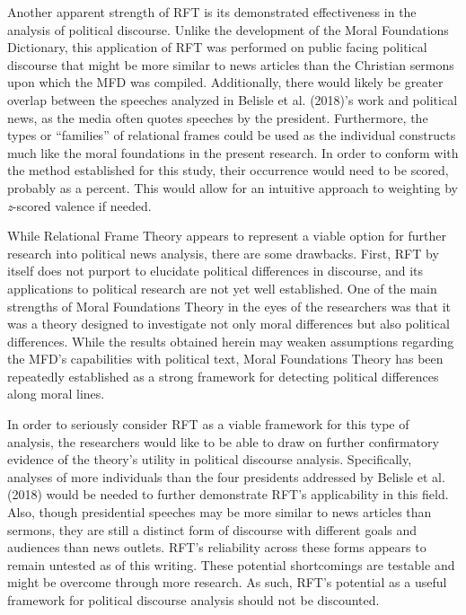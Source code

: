 \documentclass[english,,man]{apa6}
\begin{document}
Another apparent strength of RFT is its demonstrated effectiveness in the analysis of political discourse. Unlike the development of the Moral Foundations Dictionary, this application of RFT was performed on public facing political discourse that might be more similar to news articles than the Christian sermons upon which the MFD was compiled. Additionally, there would likely be greater overlap between the speeches analyzed in Belisle et al. (2018)'s work and political news, as the media often quotes speeches by the president. Furthermore, the types or \enquote{families} of relational frames could be used as the individual constructs much like the moral foundations in the present research. In order to conform with the method established for this study, their occurrence would need to be scored, probably as a percent. This would allow for an intuitive approach to weighting by \emph{z}-scored valence if needed.

While Relational Frame Theory appears to represent a viable option for further research into political news analysis, there are some drawbacks. First, RFT by itself does not purport to elucidate political differences in discourse, and its applications to political research are not yet well established. One of the main strengths of Moral Foundations Theory in the eyes of the researchers was that it was a theory designed to investigate not only moral differences but also political differences. While the results obtained herein may weaken assumptions regarding the MFD's capabilities with political text, Moral Foundations Theory has been repeatedly established as a strong framework for detecting political differences along moral lines.

In order to seriously consider RFT as a viable framework for this type of analysis, the researchers would like to be able to draw on further confirmatory evidence of the theory's utility in political discourse analysis. Specifically, analyses of more individuals than the four presidents addressed by Belisle et al. (2018) would be needed to further demonstrate RFT's applicability in this field. Also, though presidential speeches may be more similar to news articles than sermons, they are still a distinct form of discourse with different goals and audiences than news outlets. RFT's reliability across these forms appears to remain untested as of this writing. These potential shortcomings are testable and might be overcome through more research. As such, RFT's potential as a useful framework for political discourse analysis should not be discounted.
\end{document}
